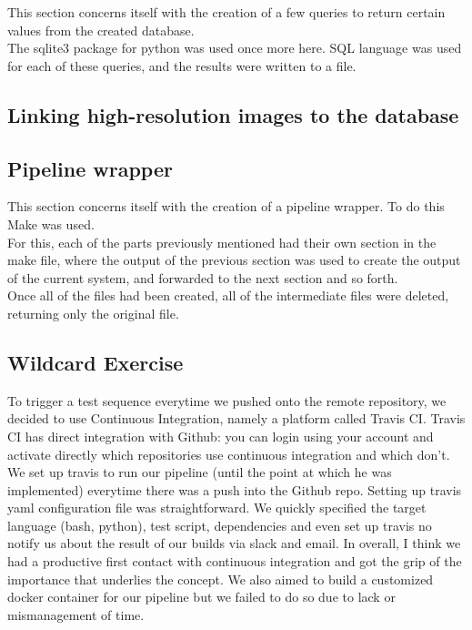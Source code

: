 \documentclass{article}
\begin{document}
This section concerns itself with the creation of a few queries to return certain values from the created database. \\

The sqlite3 package for python was used once more here. SQL language was used for each of these queries, and the results were written to a file.

\subsection*{Linking high-resolution images to the database}

\subsection*{Pipeline wrapper}

This section concerns itself with the creation of a pipeline wrapper. To do this Make was used. \\

For this, each of the parts previously mentioned had their own section in the make file, where the output of the previous section was used to create the output of the current system, and forwarded to the next section and so forth. \\

Once all of the files had been created, all of the intermediate files were deleted, returning only the original file.


\subsection*{Wildcard Exercise}

To trigger a test sequence everytime we pushed onto the remote repository, we decided to use Continuous Integration, namely a platform called Travis CI. Travis CI has direct integration with Github: you can login using your account and activate directly which repositories use continuous integration and which don't. We set up travis to run our pipeline (until the point at which he was implemented) everytime there was a push into the Github repo. Setting up travis yaml configuration file was straightforward. We quickly specified the target language (bash, python), test script, dependencies and even set up travis no notify us about the result of our builds via slack and email. In overall, I think we had a productive first contact with continuous integration and got the grip of the importance that underlies the concept. We also aimed to build a customized docker container for our pipeline but we failed to do so due to lack or mismanagement of time.
\end{document}
